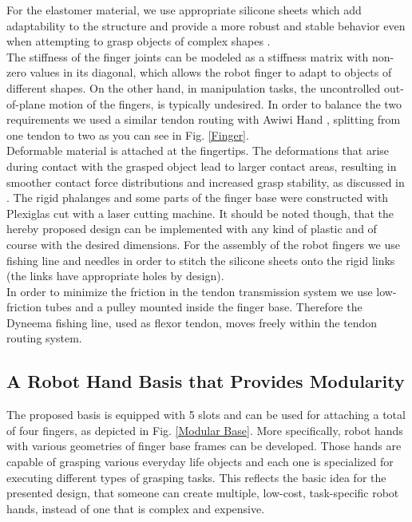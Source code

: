 For the elastomer material, we use appropriate silicone sheets which add adaptability to the structure and provide a more robust and stable behavior even when attempting to grasp objects of complex shapes \cite{DollarTM2006}. \\
The stiffness of the finger joints can be modeled as a stiffness matrix with non-zero values in its diagonal, which allows the robot finger to adapt to objects of different shapes. On the other hand, in manipulation tasks, the uncontrolled out-of-plane motion of the fingers, is typically undesired. In order to balance the two requirements we used a similar tendon routing with Awiwi Hand  \cite{GrebensteinThesis}, splitting from one tendon to two as you can see in Fig. \ref{Finger}. \\
Deformable material is attached at the fingertips. The deformations that arise during contact with the grasped object lead to larger contact areas, resulting in smoother contact force distributions and increased grasp stability, as discussed in \cite{deformableciocarlie2005}.
The rigid phalanges and some parts of the finger base were constructed with Plexiglas cut with a laser cutting machine. It should be noted though, that the hereby proposed design can be implemented with any kind of plastic and of course with the desired dimensions. For the assembly of the robot fingers we use fishing line and needles in order to stitch the silicone sheets onto the rigid links (the links have appropriate holes by design).\\
In order to minimize the friction in the tendon transmission system we use low-friction tubes and a pulley mounted inside the finger base. Therefore the Dyneema fishing line, used as flexor tendon, moves freely within the tendon routing system.\\


\newpage

\subsection{A Robot Hand Basis that Provides Modularity}

The proposed basis is equipped with 5 slots and can be used for attaching a total of four fingers, as depicted in Fig. \ref{Modular Base}. 
More specifically, robot hands with various geometries of finger base frames can be developed. Those hands are capable of grasping various everyday life objects and each one is specialized for executing different types of grasping tasks. This reflects the basic idea for the presented design, that someone can create multiple, low-cost, task-specific robot hands, instead of one that is complex and expensive.\\

